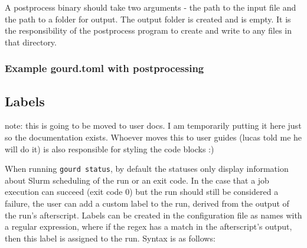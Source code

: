 A postprocess binary should take two arguments - the path to the input file and the path to a folder for output. The 
output folder is created and is empty. It is the responsibility of the postprocess program to create and write to any 
files in that directory.

\subsubsection{Example gourd.toml with postprocessing}


\subsection{Labels}
note: this is going to be moved to user docs.
I am temporarily putting it here just so the documentation exists.
Whoever moves this to user guides (lucas told me he will do it) is also responsible for styling the code blocks :)

When running \verb|gourd status|, by default the statuses only display information about Slurm scheduling of the run or an exit code.
In the case that a job execution can succeed (exit code 0) but the run should still be considered a failure, the user can add a custom label to the run, derived from the output of the run's afterscript.
Labels can be created in the configuration file as names with a regular expression, where if the regex has a match in the afterscript's output, then this label is assigned to the run.
Syntax is as follows:

